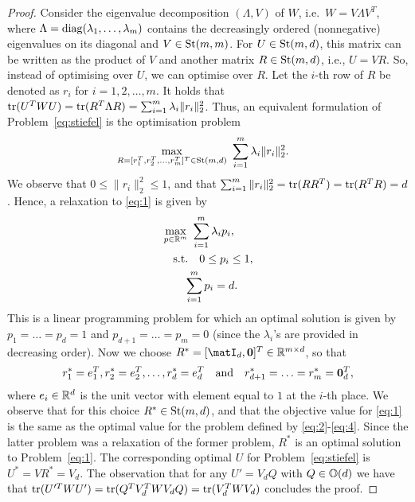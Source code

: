 \documentclass{article}
\begin{document}
%
\begin{proof}
Consider the eigenvalue decomposition $(\Lambda, V)$ of $W$, i.e.~$W = V\Lambda V^T$, where $\Lambda = \operatorname{diag}(\lambda_1,\ldots,\lambda_m)$ contains the decreasingly ordered (nonnegative) eigenvalues on its diagonal and $V \in \operatorname{St}(m,m)$. For $U \in \operatorname{St}(m,d)$, this matrix can be written as the product of $V$ and another matrix $R \in \operatorname{St}(m,d)$, i.e., $U = VR$.
%
%
So, instead of optimising over $U$, we can optimise over $R$. Let the $i$-th row of $R$ be denoted as $r_i$ for $i = 1,2, \ldots, m$.  
It holds that $\operatorname{tr}(U^TWU) =  \operatorname{tr}(R^T\Lambda R) = \sum_{i=1}^m\lambda_i\|r_i\|_{2}^2$.
%
%
%
Thus, an equivalent formulation of Problem~\eqref{eq:stiefel} is the  optimisation problem 
\begin{align}
    \label{eq:1}
    & \max_{R = [r_1^T, r_2^T, \ldots, r_m^T]^T \in \operatorname{St}(m,d)} ~\sum_{i=1}^m\lambda_i\|r_i\|_{2}^2.
\end{align}
%
We observe that $0 \leq \|r_i\|_{2}^2 \leq 1$, and that $\sum_{i=1}^m\|r_i\|_{2}^2 = \operatorname{tr}(RR^T) = \operatorname{tr}(R^TR) = d$.  Hence, a relaxation to \eqref{eq:1} is given by
\begin{align}
    \label{eq:2}
    & \max_{p \in \mathbb{R}^{m}} ~\sum_{i=1}^m\lambda_ip_i, \\
   & ~~~\text{s.t.} \quad  0 \leq p_i \leq 1, \\
   \label{eq:4}
    &\quad \quad   \sum_{i=1}^m p_i = d.
\end{align}
This is a linear programming problem for which an optimal solution is given by $p_1 = \ldots = p_d = 1$ and $p_{d+1} = \ldots = p_m = 0$  (since the $\lambda_i$'s are provided in decreasing order).
%
%
Now we choose $R^* = [\matI_d, \mathbf{0}]^T \in \R^{m \times d}$, so that
\begin{equation}
\label{eq:5}
    r_1^* = e_1^T, r_2^* = e_2^T, \ldots, r_d^* = e_d^T \quad \text{and} \quad r_{d+1}^* = \ldots = r_{m}^* = \mathbf{0}^T_d,
\end{equation}
%
where $e_i \in \mathbb{R}^{d}$ is the unit vector with element equal to $1$ at the $i$-th place.
%
We observe that for this choice $R^* \in \operatorname{St}(m,d)$, and that the objective value for \eqref{eq:1} is the same as the optimal value for the problem defined by \eqref{eq:2}-\eqref{eq:4}. Since the latter problem was a relaxation of the former problem, $R^*$ is an optimal solution to Problem~\eqref{eq:1}. 
%
%
%
%
The corresponding optimal $U$ for Problem~\eqref{eq:stiefel} is $U^* = VR^* = V_d$. The observation that for any $U' = V_d Q$ with $Q \in \mathbb{O}(d)$  we have that $\operatorname{tr}(U'^T W U') = \operatorname{tr}(Q^T V_d^T W V_d Q) = \operatorname{tr}(V_d^T W V_d)$ concludes the proof.
%
%
\end{proof}
\end{document}
